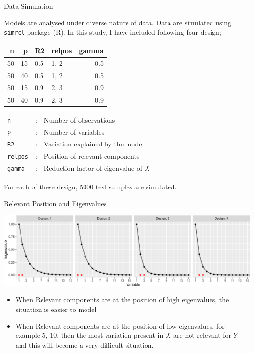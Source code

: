 \documentclass[ignorenonframetext,]{beamer}
\providecommand{\tightlist}{%
  \setlength{\itemsep}{0pt}\setlength{\parskip}{0pt}}
\begin{document}
\begin{frame}[fragile]{Data Simulation}

Models are analysed under diverse nature of data. Data are simulated
using \texttt{simrel} package (R). In this study, I have included
following four design;

\begin{longtable}[]{@{}rrllr@{}}
\toprule
n & p & R2 & relpos & gamma\tabularnewline
\midrule
\endhead
50 & 15 & 0.5 & 1, 2 & 0.5\tabularnewline
50 & 40 & 0.5 & 1, 2 & 0.5\tabularnewline
50 & 15 & 0.9 & 2, 3 & 0.9\tabularnewline
50 & 40 & 0.9 & 2, 3 & 0.9\tabularnewline
\bottomrule
\end{longtable}

\begin{longtable}[]{@{}lll@{}}
\toprule
\texttt{n} & : & Number of observations\tabularnewline
\texttt{p} & : & Number of variables\tabularnewline
\texttt{R2} & : & Variation explained by the model\tabularnewline
\texttt{relpos} & : & Position of relevant components\tabularnewline
\texttt{gamma} & : & Reduction factor of eigenvalue of
\(X\)\tabularnewline
\bottomrule
\end{longtable}

For each of these design, 5000 test samples are simulated.

\end{frame}

\begin{frame}{Relevant Position and Eigenvalues}

\includegraphics{Main_files/figure-beamer/unnamed-chunk-4-1.pdf}

\begin{itemize}
\tightlist
\item
  When Relevant components are at the position of high eigenvalues, the
  situation is easier to model
\item
  When Relevant components are at the position of low eigenvalues, for
  example 5, 10, then the most variation present in \(X\) are not
  relevant for \(Y\) and this will become a very difficult situation.
\end{itemize}

\end{frame}
\end{document}
